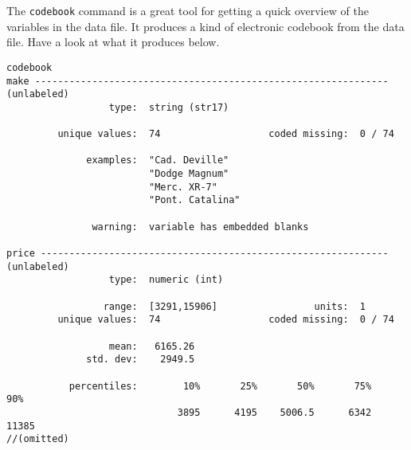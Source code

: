 The \lstinline{codebook} command is a great tool for getting a quick overview of the variables in the data file. It produces a kind of electronic codebook from the data file. Have a look at what it produces below.

\begin{lstlisting}
codebook
make -------------------------------------------------------------- (unlabeled)
                  type:  string (str17)

         unique values:  74                   coded missing:  0 / 74

              examples:  "Cad. Deville"
                         "Dodge Magnum"
                         "Merc. XR-7"
                         "Pont. Catalina"

               warning:  variable has embedded blanks

price ------------------------------------------------------------- (unlabeled)
                  type:  numeric (int)

                 range:  [3291,15906]                 units:  1
         unique values:  74                   coded missing:  0 / 74

                  mean:   6165.26
              std. dev:    2949.5

           percentiles:        10%       25%       50%       75%       90%
                              3895      4195    5006.5      6342     11385
//(omitted)
\end{lstlisting}

